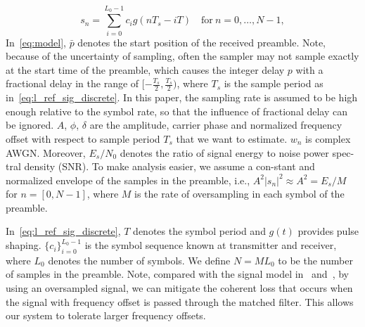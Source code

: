 \begin{equation}
    \label{eq:l_ref_sig_discrete}
    s_n=\sum_{i=0}^{L_0-1} c_i g(nT_s-iT) \quad \text{for}~n=0,\ldots,N-1, 
  \end{equation}
In~\eqref{eq:model}, $\bar{p}$ denotes the start position of the received preamble.
Note, because of the uncertainty of sampling, often the sampler may not sample exactly at the start time of the preamble, which causes
the integer delay $p$ with a fractional delay in the range of $[-\frac{T_s}{2},\frac{T_s}{2})$, where $T_s$ is the sample period as in~\eqref{eq:l_ref_sig_discrete}.
In this paper, the sampling rate is assumed to be high enough relative to the symbol rate, so that the influence of fractional delay can be ignored.
$A$, $\phi$, $\delta$ are the amplitude, carrier phase and normalized
frequency offset with respect to sample period $T_s$ that we want to estimate.
$w_n$ is complex AWGN. Moreover,
$E_s/N_0$ denotes the ratio of signal energy to noise power spec-tral density (SNR).
To make analysis easier, we assume a con-stant and normalized envelope of the samples in the 
preamble, i.e., $A^2|s_n|^2\approx A^2=E_s/M$ for $n=[0,N-1]$, where $M$ is the rate
of oversampling in each symbol of the preamble.

In~\eqref{eq:l_ref_sig_discrete}, $T$ denotes the symbol period and $g(t)$ provides pulse shaping.
$\{c_i\}_{i=0}^{L_0-1}$ is the symbol sequence known at transmitter and receiver, where $L_0$ denotes the number of symbols.
We define $N=ML_0$ to be the number of samples in the preamble.
Note, compared with the signal model in~\cite{Morelli_Mengali_98} and~\cite{Ramakrishnan_10}, 
by using an oversampled signal, we can mitigate the coherent loss that occurs
when the signal with frequency offset is passed through the matched filter.
This allows our system to tolerate larger frequency offsets.



